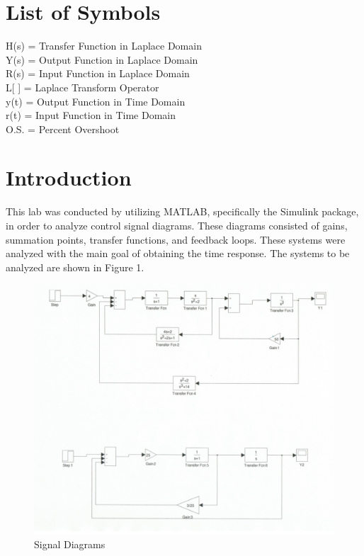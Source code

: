 \documentclass[12pt]{article}
\begin{document}
\section*{\fontsize{12}{12}\selectfont \large List of Symbols}
 H(s) = Transfer Function in Laplace Domain\\
Y(s) = Output Function in Laplace Domain\\
R(s) = Input Function in Laplace Domain\\
L[ ] = Laplace Transform Operator\\
y(t) = Output Function in Time Domain\\
r(t) = Input Function in Time Domain\\
O.S. = Percent Overshoot\\

\newpage



\section*{\fontsize{12}{12}\selectfont \large Introduction}
This lab was conducted by utilizing MATLAB, specifically the Simulink package, in order to analyze control signal diagrams. These diagrams consisted of gains, summation points, transfer functions, and feedback loops. These systems were analyzed with the main goal of obtaining the time response. The systems to be analyzed are shown in Figure 1. 
\bigskip
\bigskip

\begin{figure}[htbp] %
   \centering
   \includegraphics[width=\linewidth]{signal_diagrams.jpg} 
   \caption{Signal Diagrams}
   \label{fig:example}
\end{figure}
\end{document}
